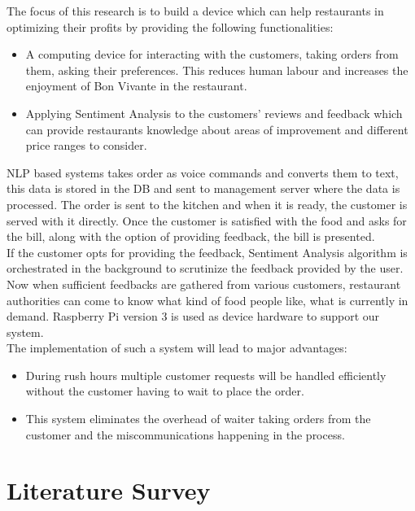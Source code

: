 \documentclass[conference]{IEEEtran}
\begin{document}
	The focus of this research is to build a device which can help restaurants in optimizing their profits by providing the following functionalities:
	\begin{itemize}
		\item A computing device for interacting with the customers, taking orders from them, asking their preferences. This reduces human labour and increases the enjoyment of Bon Vivante in the restaurant.
		
		\item Applying Sentiment Analysis to the customers' reviews and feedback which can provide restaurants knowledge about areas of improvement and different price ranges to consider.
	\end{itemize}

	NLP based systems takes order as voice commands and converts them to text, this data is stored in the DB and sent to management server where the data is processed. The order is sent to the kitchen and when it is ready, the customer is served with it directly. Once the customer is satisfied with the food and asks for the bill, along with the option of providing feedback, the bill is presented.\\
	If the customer opts for providing the feedback, Sentiment Analysis algorithm is orchestrated in the background to scrutinize the feedback provided by the user. Now when sufficient feedbacks are gathered from various customers, restaurant authorities can come to know what kind of food people like, what is currently in demand. Raspberry Pi version 3 is used as device hardware to support our system. \\
	The implementation of such a system will lead to major advantages: 
	
	\begin{itemize}
		
		\item During rush hours multiple customer requests will be handled efficiently without the customer having to wait to place the order. 
		
		\item This system eliminates the overhead of waiter taking orders from the customer and the miscommunications happening in the process. 
		
	\end{itemize}
	
	
	\section{Literature Survey}
\end{document}
